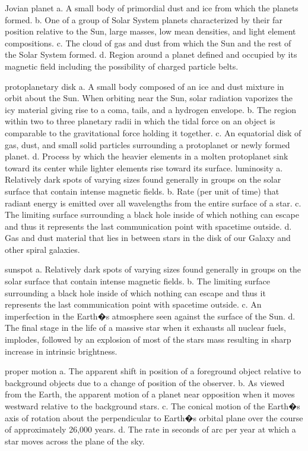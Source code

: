     Jovian planet
    a. A small body of primordial dust and ice from which the planets formed.
    b. One of a group of Solar System planets characterized by their far position relative to the Sun, large masses, low mean densities, and light element compositions.
    c. The cloud of gas and dust from which the Sun and the rest of the Solar System formed.
    d. Region around a planet defined and occupied by its magnetic field including the possibility of charged particle belts.

    protoplanetary disk
    a. A small body composed of an ice and dust mixture in orbit about the Sun. When orbiting near the Sun, solar radiation vaporizes the icy material giving rise to a coma, tails, and a hydrogen envelope. b. The region within two to three planetary radii in which the tidal force on an object is comparable to the gravitational force holding it together. c. An equatorial disk of gas, dust, and small solid particles surrounding a protoplanet or newly formed planet. d. Process by which the heavier elements in a molten protoplanet sink toward its center while lighter elements rise toward its surface.
    luminosity
    a. Relatively dark spots of varying sizes found generally in groups on the solar surface that contain intense magnetic fields.
    b. Rate (per unit of time) that radiant energy is emitted over all wavelengths from the entire surface of a star.
    c. The limiting surface surrounding a black hole inside of which nothing can escape and thus it represents the last communication point with spacetime outside.
    d. Gas and dust material that lies in between stars in the disk of our Galaxy and other spiral galaxies.

    sunspot
    a. Relatively dark spots of varying sizes found generally in groups on the solar surface that contain intense magnetic fields.
    b. The limiting surface surrounding a black hole inside of which nothing can escape and thus it represents the last communication point with spacetime outside.
    c. An imperfection in the Earth�s atmosphere seen against the surface of the Sun.
    d. The final stage in the life of a massive star when it exhausts all nuclear fuels, implodes, followed by an explosion of most of the stars mass resulting in sharp increase in intrinsic brightness.

    proper motion
    a. The apparent shift in position of a foreground object relative to background objects due to a change of position of the observer.
    b. As viewed from the Earth, the apparent motion of a planet near opposition when it moves westward relative to the background stars.
    c. The conical motion of the Earth�s axis of rotation about the perpendicular to Earth�s orbital plane over the course of approximately 26,000 years.
    d. The rate in seconds of arc per year at which a star moves across the plane of the sky.

